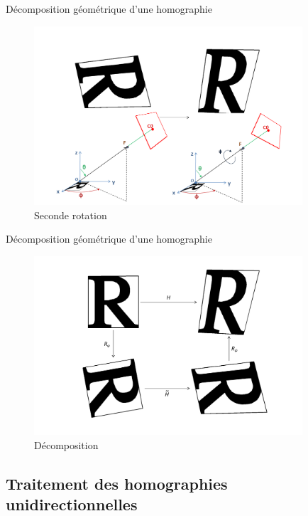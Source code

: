 \documentclass[c,12pt]{beamer}
\begin{document}
  \begin{frame}{Décomposition géométrique d'une homographie}
  \begin{figure}
   \centering
   \includegraphics[width=100mm]{beamer_decompo3_rotation_psi.png}
   \caption{Seconde rotation}
  \end{figure}
  \end{frame}

  \begin{frame}{Décomposition géométrique d'une homographie}
  \begin{figure}
   \centering
   \includegraphics[width=100mm]{beamer_decompo_bilan.png}
   \caption{Décomposition}
  \end{figure}
  \end{frame}




 \subsection{Traitement des homographies unidirectionnelles}

\end{document}

